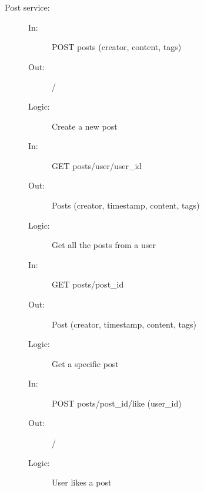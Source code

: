 \documentclass{article}
\begin{document}
\begin{description}
    \item [Post service:] 
    \begin{description}
        \item[]
        \item[In:] POST posts (creator, content, tags)
        \item[Out:] /
        \item[Logic:] Create a new post
        \item[]

        \item[In:] GET posts/user/user\_id
        \item[Out:] Posts (creator, timestamp, content, tags)
        \item[Logic:] Get all the posts from a user
        \item[]

        \item[In:] GET posts/post\_id
        \item[Out:] Post (creator, timestamp, content, tags)
        \item[Logic:] Get a specific post
        \item[]
        
        \item[In:] POST posts/post\_id/like (user\_id)
        \item[Out:] /
        \item[Logic: ] User likes a post
    \end{description}
\end{description}
\end{document}
